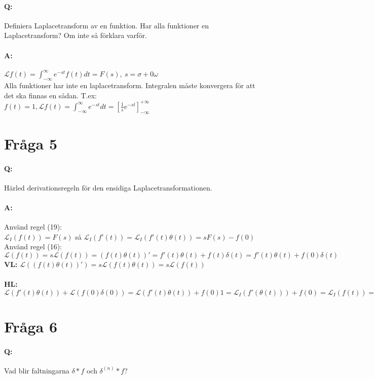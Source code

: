 \documentclass[a4paper]{article}
\begin{document}
\paragraph{Q:} Definiera Laplacetransform av en funktion. Har alla funktioner en Laplacetransform? Om inte så förklara varför.
\paragraph{A:} $\mathcal{L} f(t) = \int_{-\infty}^{\infty} e^{-st}f(t)dt=F(s),\> s=\sigma + 0 \omega$ \\

Alla funktioner har inte en laplacetransform. Integralen måste konvergera för att det ska finnas en sådan. T.ex:\\$f(t)=1, \mathcal{L}f(t) = \int_{-\infty}^{\infty} e^{-st}dt = [\frac{1}{s} e^{-st}]_{-\infty}^{+\infty} $ 

\section{Fråga 5}
\paragraph{Q:} Härled derivationsregeln för den ensidiga Laplacetransformationen.
\paragraph{A:} Använd regel (19): \\  $\mathcal{L}_I (f(t)) = F(s)$ så $\mathcal{L}_I (f'(t)) =\mathcal{L}_I (f'(t) \theta (t)) = sF(s) - f(0)$ \\
Använd regel (16): \\  $\mathcal{L}(f(t)) = s\mathcal{L}(f(t)) = (f(t)\theta(t))' = f'(t)\theta(t) + f(t)\delta(t) = f'(t)\theta(t) + f(0)\delta(t)$ \\
\textbf{VL:} $\mathcal{L}((f(t)\theta(t))') = s\mathcal{L}(f(t)\theta(t)) = s\mathcal{L}(f(t)) $ \\ \\
\textbf{HL:} $\mathcal{L}(f'(t)\theta(t)) + \mathcal{L}(f(0)\delta(0)) = \mathcal{L}(f'(t)\theta(t)) +f(0)1 = \mathcal{L}_I(f'(\theta(t))) + f(0) = \mathcal{L}_I(f(t)) = s\mathcal{L}_I(f(t)) - f(0) $

\section{Fråga 6}
\paragraph{Q:} Vad blir faltningarna $\delta * f$ och $\delta ^{(n)} * f$?
\end{document}
